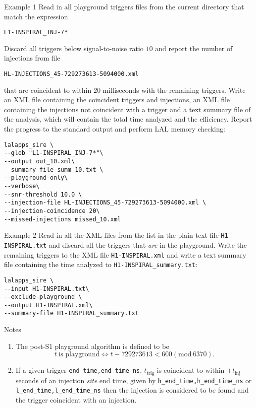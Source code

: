 \begin{entry}
\item[Example 1] Read in all playground triggers files from the current
directory that match the expression 
\begin{verbatim}
L1-INSPIRAL_INJ-7*
\end{verbatim}
Discard all triggers below signal-to-noise ratio $10$ and report the number of
injections from file 
\begin{verbatim}
HL-INJECTIONS_45-729273613-5094000.xml
\end{verbatim}
that are coincident to within $20$ milliseconds with the remaining triggers.
Write an XML file containing the coincident triggers and injections, an XML
file containing the injections not coincident with a trigger and a text
summary file of the analysis, which will contain the total time analyzed and
the efficiency. Report the progress to the standard output and perform LAL
memory checking:
\begin{verbatim}
lalapps_sire \
--glob "L1-INSPIRAL_INJ-7*"\
--output out_10.xml\
--summary-file summ_10.txt \
--playground-only\
--verbose\
--snr-threshold 10.0 \
--injection-file HL-INJECTIONS_45-729273613-5094000.xml \
--injection-coincidence 20\
--missed-injections missed_10.xml
\end{verbatim}

\item[Example 2] Read in all the XML files from the list in the plain text
file \verb$H1-INSPIRAL.txt$ and discard all the triggers that \emph{are} in
the playground. Write the remaining triggers to the XML file
\verb$H1-INSPIRAL.xml$ and write a text summary file containing the time
analyzed to \verb$H1-INSPIRAL_summary.txt$:
\begin{verbatim}
lalapps_sire \
--input H1-INSPIRAL.txt\ 
--exclude-playground \
--output H1-INSPIRAL.xml\ 
--summary-file H1-INSPIRAL_summary.txt
\end{verbatim}

\item[Notes]
\begin{enumerate}
\item The post-S1 playground algorithm is defined to be
\begin{equation}
t \ \textrm{is playground} \iff t - 729273613 < 600 (\textrm{mod}\ 6370).
\end{equation}

\item If a given trigger \verb$end_time,end_time_ns$, $t_\mathrm{trig}$ is
coincident to within $\pm t_\mathrm{inj}$ seconds of an injection \emph{site}
end time, given by \verb$h_end_time,h_end_time_ns$ or
\verb$l_end_time,l_end_time_ns$ then the injection is considered to be found
and the trigger coincident with an injection.


\end{enumerate}
\end{entry}

